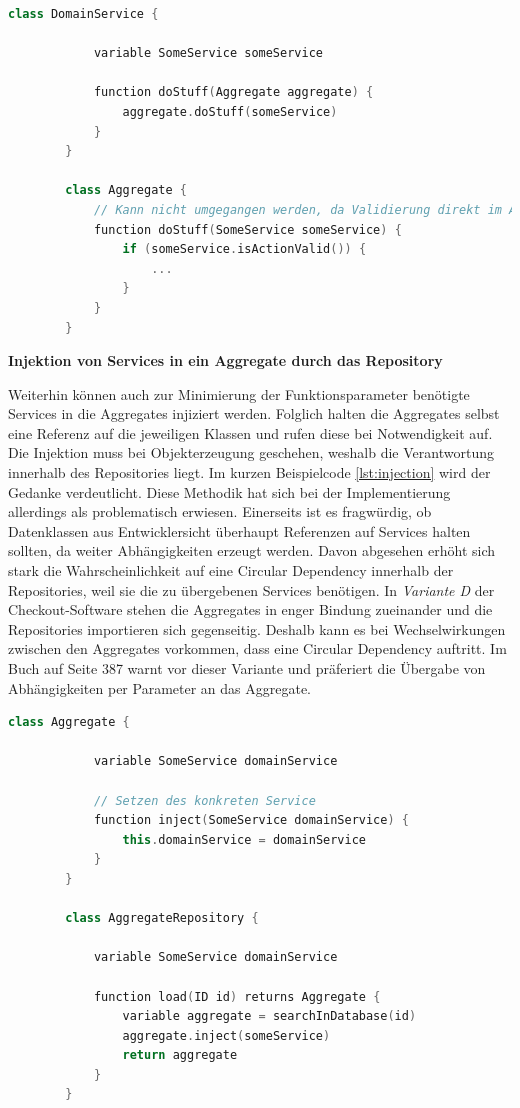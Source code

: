 \begin{minipage}{\linewidth} %
	\begin{lstlisting}[caption={Übergabe der Referenz an das Aggregate als Parameter}, label={lst:parameter}, language=Kotlin]
		class DomainService {
			
			variable SomeService someService
			
			function doStuff(Aggregate aggregate) {
				aggregate.doStuff(someService)
			}
		}
		
		class Aggregate {
			// Kann nicht umgegangen werden, da Validierung direkt im Aggregate geschieht
			function doStuff(SomeService someService) {
				if (someService.isActionValid()) {
					...
				}
			}
		}
	\end{lstlisting}
\end{minipage}

\textbf{Injektion von Services in ein Aggregate durch das Repository}

Weiterhin können auch zur Minimierung der Funktionsparameter benötigte Services in die Aggregates injiziert werden. Folglich halten die Aggregates selbst eine Referenz auf die jeweiligen Klassen und rufen diese bei Notwendigkeit auf. Die Injektion muss bei Objekterzeugung geschehen, weshalb die Verantwortung innerhalb des Repositories liegt. Im kurzen Beispielcode \ref{lst:injection} wird der Gedanke verdeutlicht. Diese Methodik hat sich bei der Implementierung allerdings als problematisch erwiesen. Einerseits ist es fragwürdig, ob Datenklassen aus Entwicklersicht überhaupt Referenzen auf Services halten sollten, da weiter Abhängigkeiten erzeugt werden. Davon abgesehen erhöht sich stark die Wahrscheinlichkeit auf eine Circular Dependency innerhalb der Repositories, weil sie die zu übergebenen Services benötigen. In \emph{Variante D} der Checkout-Software stehen die Aggregates in enger Bindung zueinander und die Repositories importieren sich gegenseitig. Deshalb kann es bei Wechselwirkungen zwischen den Aggregates vorkommen, dass eine Circular Dependency auftritt. Im Buch  auf Seite 387 warnt \citeauthor{Vernon.2015} vor dieser Variante und präferiert die Übergabe von Abhängigkeiten per Parameter an das Aggregate.

\begin{minipage}{\linewidth} %
	\begin{lstlisting}[caption={Injektion eines Services in ein Aggregate durch das Repository}, label={lst:injection}, language=Kotlin]
		class Aggregate {
			
			variable SomeService domainService
			
			// Setzen des konkreten Service
			function inject(SomeService domainService) {
				this.domainService = domainService
			}
		}
		
		class AggregateRepository {
			
			variable SomeService domainService
			
			function load(ID id) returns Aggregate {
				variable aggregate = searchInDatabase(id)
				aggregate.inject(someService)
				return aggregate
			}
		}
	\end{lstlisting}
\end{minipage}


